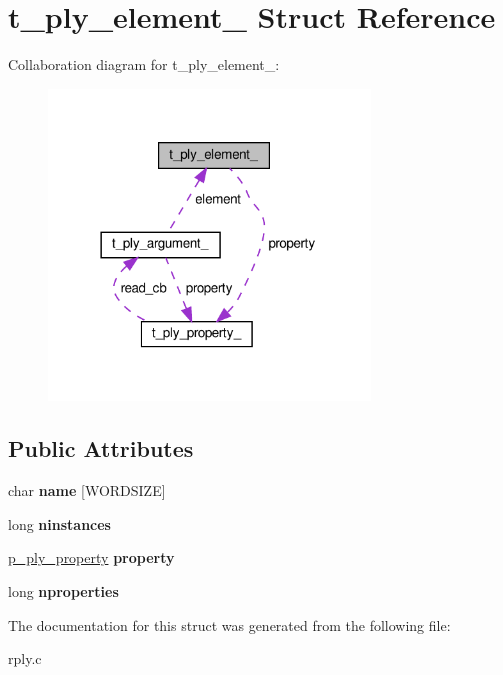 \hypertarget{structt__ply__element__}{}\section{t\+\_\+ply\+\_\+element\+\_\+ Struct Reference}
\label{structt__ply__element__}


Collaboration diagram for t\+\_\+ply\+\_\+element\+\_\+\+:\nopagebreak
\begin{figure}[H]
\begin{center}
\leavevmode
\includegraphics[width=242pt]{structt__ply__element____coll__graph}
\end{center}
\end{figure}
\subsection*{Public Attributes}
\begin{DoxyCompactItemize}
\item 
\mbox{\label{structt__ply__element___a4190e367a648df18c038ef3cbe80e266}} 
char {\bfseries name} \mbox{[}W\+O\+R\+D\+S\+I\+ZE\mbox{]}
\item 
\mbox{\label{structt__ply__element___a742314a40fcbc69660907d9be9ae4927}} 
long {\bfseries ninstances}
\item 
\mbox{\label{structt__ply__element___adf2e07d9d09ac4c1152c396f88bf8ddc}} 
\hyperlink{structt__ply__property__}{p\+\_\+ply\+\_\+property} {\bfseries property}
\item 
\mbox{\label{structt__ply__element___a604596912c74d0521a02561884c1ffa9}} 
long {\bfseries nproperties}
\end{DoxyCompactItemize}


The documentation for this struct was generated from the following file\+:\begin{DoxyCompactItemize}
\item 
rply.\+c\end{DoxyCompactItemize}
